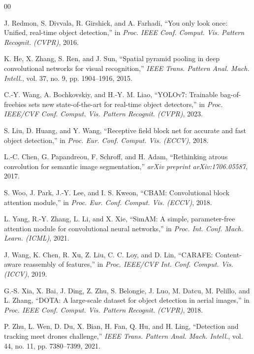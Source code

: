 \documentclass[conference]{IEEEtran}
\begin{document}

\begin{thebibliography}{00}

J. Redmon, S. Divvala, R. Girshick, and A. Farhadi, ``You only look once: Unified, real-time object detection,'' in \emph{Proc. IEEE Conf. Comput. Vis. Pattern Recognit. (CVPR)}, 2016.

K. He, X. Zhang, S. Ren, and J. Sun, ``Spatial pyramid pooling in deep convolutional networks for visual recognition,'' \emph{IEEE Trans. Pattern Anal. Mach. Intell.}, vol. 37, no. 9, pp. 1904--1916, 2015.

C.-Y. Wang, A. Bochkovskiy, and H.-Y. M. Liao, ``YOLOv7: Trainable bag-of-freebies sets new state-of-the-art for real-time object detectors,'' in \emph{Proc. IEEE/CVF Conf. Comput. Vis. Pattern Recognit. (CVPR)}, 2023.

S. Liu, D. Huang, and Y. Wang, ``Receptive field block net for accurate and fast object detection,'' in \emph{Proc. Eur. Conf. Comput. Vis. (ECCV)}, 2018.

L.-C. Chen, G. Papandreou, F. Schroff, and H. Adam, ``Rethinking atrous convolution for semantic image segmentation,'' \emph{arXiv preprint arXiv:1706.05587}, 2017.

S. Woo, J. Park, J.-Y. Lee, and I. S. Kweon, ``CBAM: Convolutional block attention module,'' in \emph{Proc. Eur. Conf. Comput. Vis. (ECCV)}, 2018.

L. Yang, R.-Y. Zhang, L. Li, and X. Xie, ``SimAM: A simple, parameter-free attention module for convolutional neural networks,'' in \emph{Proc. Int. Conf. Mach. Learn. (ICML)}, 2021.

J. Wang, K. Chen, R. Xu, Z. Liu, C. C. Loy, and D. Lin, ``CARAFE: Content-aware reassembly of features,'' in \emph{Proc. IEEE/CVF Int. Conf. Comput. Vis. (ICCV)}, 2019.

G.-S. Xia, X. Bai, J. Ding, Z. Zhu, S. Belongie, J. Luo, M. Datcu, M. Pelillo, and L. Zhang, ``DOTA: A large-scale dataset for object detection in aerial images,'' in \emph{Proc. IEEE Conf. Comput. Vis. Pattern Recognit. (CVPR)}, 2018.

P. Zhu, L. Wen, D. Du, X. Bian, H. Fan, Q. Hu, and H. Ling, ``Detection and tracking meet drones challenge,'' \emph{IEEE Trans. Pattern Anal. Mach. Intell.}, vol. 44, no. 11, pp. 7380--7399, 2021.

\end{thebibliography}
\end{document}
